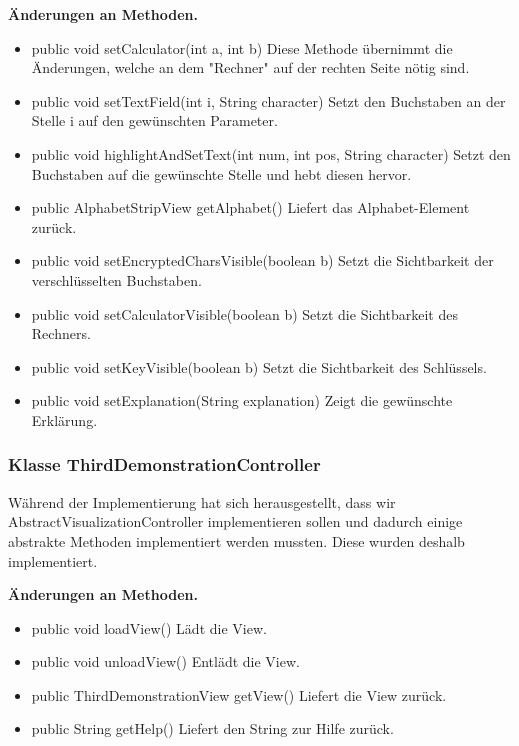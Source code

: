 \documentclass{article}
\begin{document}
    \textbf{Änderungen an Methoden.}
      \begin{itemize}
        \item public void setCalculator(int a, int b)\newline
              Diese Methode übernimmt die Änderungen, welche an dem "Rechner" auf der rechten Seite nötig sind.
        \item public void setTextField(int i, String character)\newline
              Setzt den Buchstaben an der Stelle i auf den gewünschten Parameter.
		\item public void highlightAndSetText(int num, int pos, String character)\newline
              Setzt den Buchstaben auf die gewünschte Stelle und hebt diesen hervor.
		\item public AlphabetStripView getAlphabet()\newline
              Liefert das Alphabet-Element zurück.
		\item public void setEncryptedCharsVisible(boolean b)\newline
              Setzt die Sichtbarkeit der verschlüsselten Buchstaben.
		\item public void setCalculatorVisible(boolean b)\newline
              Setzt die Sichtbarkeit des Rechners.
		\item public void setKeyVisible(boolean b)\newline
              Setzt die Sichtbarkeit des Schlüssels.
		\item public void setExplanation(String explanation)\newline
              Zeigt die gewünschte Erklärung.
	  \end{itemize}

    \subsubsection{Klasse ThirdDemonstrationController}
	Während der Implementierung hat sich herausgestellt, dass wir AbstractVisualizationController implementieren sollen und dadurch 
	einige abstrakte Methoden implementiert werden mussten. Diese wurden deshalb implementiert.\newline
           
    \textbf{Änderungen an Methoden.}
      \begin{itemize}
		\item public void loadView()\newline
              Lädt die View.
        \item public void unloadView()\newline
              Entlädt die View.
        \item public ThirdDemonstrationView getView()\newline
              Liefert die View zurück.
        \item public String getHelp()\newline
              Liefert den String zur Hilfe zurück.
      \end{itemize}
\end{document}
